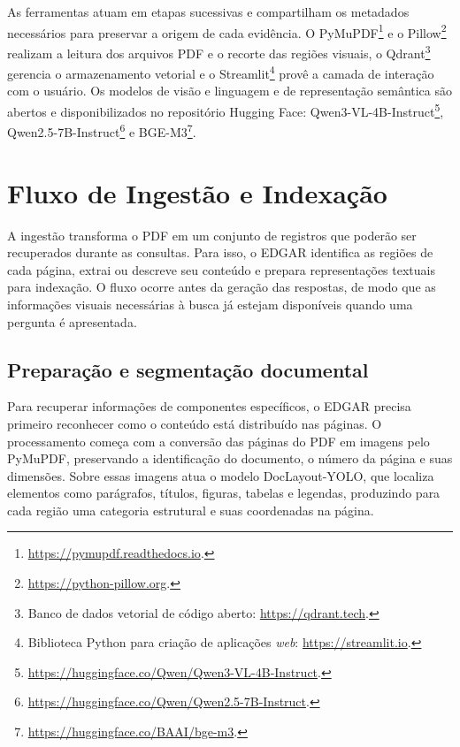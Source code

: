 As ferramentas atuam em etapas sucessivas e compartilham os metadados necessários para preservar a origem de cada evidência. O PyMuPDF\footnote{\url{https://pymupdf.readthedocs.io}.} e o Pillow\footnote{\url{https://python-pillow.org}.} realizam a leitura dos arquivos PDF e o recorte das regiões visuais, o Qdrant\footnote{Banco de dados vetorial de código aberto: \url{https://qdrant.tech}.} gerencia o armazenamento vetorial e o Streamlit\footnote{Biblioteca Python para criação de aplicações \textit{web}: \url{https://streamlit.io}.} provê a camada de interação com o usuário. Os modelos de visão e linguagem e de representação semântica são abertos e disponibilizados no repositório Hugging Face: Qwen3-VL-4B-Instruct\footnote{\url{https://huggingface.co/Qwen/Qwen3-VL-4B-Instruct}.}, Qwen2.5-7B-Instruct\footnote{\url{https://huggingface.co/Qwen/Qwen2.5-7B-Instruct}.} e BGE-M3\footnote{\url{https://huggingface.co/BAAI/bge-m3}.}.

\section{Fluxo de Ingestão e Indexação}
\label{sec:fluxo_assincrono_ingestao_indexacao}

A ingestão transforma o PDF em um conjunto de registros que poderão ser recuperados durante as consultas. Para isso, o EDGAR identifica as regiões de cada página, extrai ou descreve seu conteúdo e prepara representações textuais para indexação. O fluxo ocorre antes da geração das respostas, de modo que as informações visuais necessárias à busca já estejam disponíveis quando uma pergunta é apresentada.

\subsection{Preparação e segmentação documental}
\label{subsec:fase1_unificacao_visual}
\label{subsec:fase2_analise_layout}
\label{subsec:fase3_isolamento_geometrico}

Para recuperar informações de componentes específicos, o EDGAR precisa primeiro reconhecer como o conteúdo está distribuído nas páginas. O processamento começa com a conversão das páginas do PDF em imagens pelo PyMuPDF, preservando a identificação do documento, o número da página e suas dimensões. Sobre essas imagens atua o modelo DocLayout-YOLO, que localiza elementos como parágrafos, títulos, figuras, tabelas e legendas, produzindo para cada região uma categoria estrutural e suas coordenadas na página.

